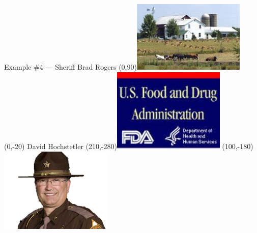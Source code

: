 \begin{frame}{Example \#4 --- Sheriff Brad Rogers}
    \Put(0,90){\includegraphics[height=0.5\textheight,keepaspectratio=true,width=0.4\textwidth]{img/hochstetler-dairy.png}}
    \Put(0,-20){ David Hochstetler }
    \Put(210,-280){\includegraphics[height=0.5\textheight,keepaspectratio=true,width=0.4\textwidth]{img/fda.png}}
    \Put(100,-180){\includegraphics[height=0.5\textheight,keepaspectratio=true,width=0.4\textwidth]{img/brad-rogers.png}}
\end{frame}

